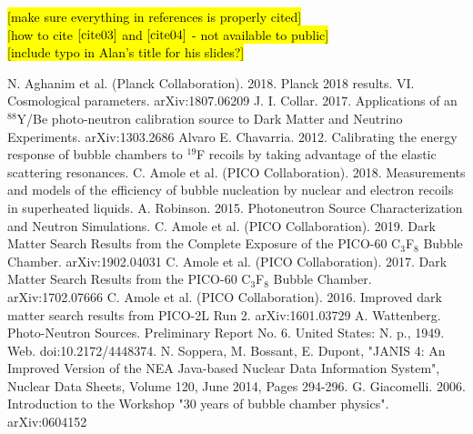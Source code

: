 \documentclass[%
12pt,
twoside,
reprint,
amsmath,amssymb,
aps,
]{article}
\begin{document}
	\pagebreak
	\noindent \hl{[make sure everything in references is properly cited]}\\
	\hl{[how to cite $\cite{cite03}$ and $\cite{cite04}$ - not available to public]} \\
	\hl{[include typo in Alan's title for his slides?]}
	\begin{thebibliography}{1}
		 N. Aghanim et al. (Planck Collaboration). 2018. Planck 2018 results. VI. Cosmological parameters. arXiv:1807.06209 
		 J. I. Collar. 2017. Applications of an $^{88}$Y/Be photo-neutron calibration source
		to Dark Matter and Neutrino Experiments. arXiv:1303.2686
		 Alvaro E. Chavarria. 2012. Calibrating the energy response of bubble chambers to $^{19}$F recoils by taking advantage of the elastic scattering resonances.
		 C. Amole et al. (PICO Collaboration). 2018. Measurements and models of the efficiency of bubble nucleation by nuclear and electron recoils in superheated liquids. 	
		 A. Robinson. 2015. Photoneutron Source Characterization and Neutron Simulations.
		 C. Amole et al. (PICO Collaboration). 2019. Dark Matter Search Results from the  Complete Exposure of the PICO-60 C$_{3}$F$_{8}$ Bubble Chamber. arXiv:1902.04031 
		 C. Amole et al. (PICO Collaboration). 2017. Dark Matter Search Results from the PICO-60 C$_{3}$F$_{8}$ Bubble Chamber. arXiv:1702.07666 
		 C. Amole et al. (PICO Collaboration). 2016. Improved dark matter search results from PICO-2L Run 2. arXiv:1601.03729
		 A. Wattenberg. Photo-Neutron Sources. Preliminary Report No. 6. United States: N. p., 1949. Web. doi:10.2172/4448374.
		 N. Soppera, M. Bossant, E. Dupont, "JANIS 4: An Improved Version of the NEA Java-based Nuclear Data Information System", Nuclear Data Sheets, Volume 120, June 2014, Pages 294-296.
		 G. Giacomelli. 2006. Introduction to the Workshop "30 years of bubble chamber physics". arXiv:0604152
		
	\end{thebibliography}
\end{document}
